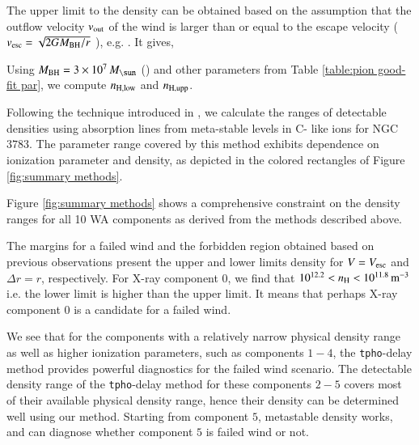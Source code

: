 \documentclass{aa}
\begin{document}
The upper limit to the density can be obtained based on the assumption that the outflow velocity $v_{\rm out}$ of the wind is larger than or equal to the escape velocity ($  v_{\rm esc} = \sqrt{ 2 G M_{\rm BH} / r}$ ), e.g. \cite{Blustin2005A&A}. 
It gives,

Using $M_{\rm BH} = 3 \times 10^7 \, M_{\sun}$ (\citealp{Vestergaard2006ApJ}) and other parameters from Table \ref{table:pion good-fit par}, we compute $n_{\rm H, low}$ and $n_{\rm H, upp}$.



Following the technique introduced in \cite{Mao2017A&A}, we calculate the ranges of detectable densities using absorption lines from meta-stable levels in C- like ions for NGC $3783$.
The parameter range covered by this method exhibits dependence on ionization parameter and density, as depicted in the colored rectangles of Figure \ref{fig:summary methods}.



%



  


Figure \ref{fig:summary methods} shows a comprehensive constraint on the density ranges for all 10 WA components as derived from the methods described above.



The margins for a failed wind and the forbidden region obtained based on previous observations present the upper and lower limits density for $ V = V_{\rm esc}$ and \(\Delta r = r \), respectively.
For X-ray component $0$, we find that $ 10^{12.2} < n_{\rm H} < 10^{11.8} \, \rm m^{-3}$ i.e. the lower limit is higher than the upper limit.
It means that perhaps X-ray component $0$ is a candidate for a failed wind.



We see that for the components with a relatively narrow physical density range as well as higher ionization parameters, such as components $1 - 4$, the \texttt{tpho}-delay method provides powerful diagnostics for the failed wind scenario. 
The detectable density range of the \texttt{tpho}-delay method for these components $2 - 5$ covers most of their available physical density range, hence their density can be determined well using our method.
Starting from component $5$, metastable density works,  and  can diagnose whether component $5$ is failed wind or not.
\end{document}
